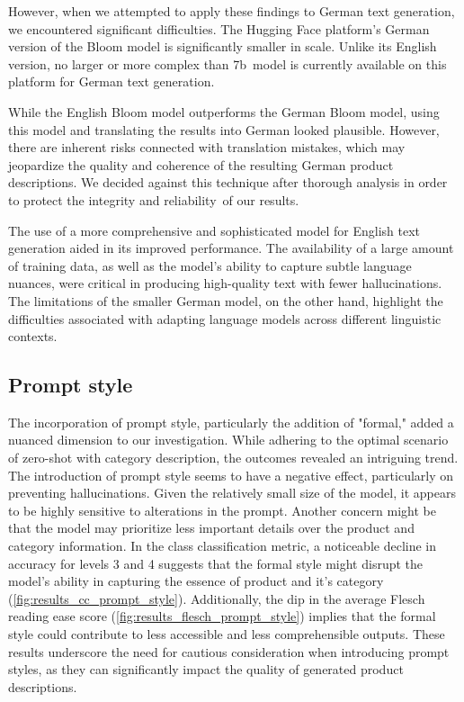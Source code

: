 However, when we attempted to apply these findings to German text generation, we encountered significant difficulties. The Hugging Face platform's German version of the Bloom model is significantly smaller in scale. Unlike its English version, no larger or more complex than 7b model is currently available on this platform for German text generation. 

While the English Bloom model outperforms the German Bloom model, using this model and translating the results into German looked plausible. However, there are inherent risks connected with translation mistakes, which may jeopardize the quality and coherence of the resulting German product descriptions. We decided against this technique after thorough analysis in order to protect the integrity and reliability of our results.

The use of a more comprehensive and sophisticated model for English text generation aided in its improved performance. The availability of a large amount of training data, as well as the model's ability to capture subtle language nuances, were critical in producing high-quality text with fewer hallucinations. The limitations of the smaller German model, on the other hand, highlight the difficulties associated with adapting language models across different linguistic contexts. 

\subsection{Prompt style}

The incorporation of prompt style, particularly the addition of "formal," added a nuanced dimension to our investigation. While adhering to the optimal scenario of zero-shot with category description, the outcomes revealed an intriguing trend. The introduction of prompt style seems to have a negative effect, particularly on preventing hallucinations. Given the relatively small size of the model, it appears to be highly sensitive to alterations in the prompt. Another concern might be that the model may prioritize less important details over the product and category information. In the class classification metric, a noticeable decline in accuracy for levels 3 and 4 suggests that the formal style might disrupt the model's ability in capturing the essence of product and it's category (\autoref{fig:results_cc_prompt_style}). Additionally, the dip in the average Flesch reading ease score (\autoref{fig:results_flesch_prompt_style}) implies that the formal style could contribute to less accessible and less comprehensible outputs. These results underscore the need for cautious consideration when introducing prompt styles, as they can significantly impact the quality of generated product descriptions.

